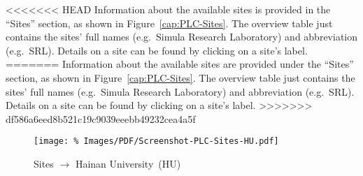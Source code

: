 <<<<<<< HEAD
Information about the available  sites is provided in the ``Sites'' section, as shown in Figure~\ref{cap:PLC-Sites}. The overview table just contains the sites' full names (e.g.\ Simula Research Laboratory) and abbreviation (e.g.\ SRL). Details on a site can be found by clicking on a site's label.
=======
Information about the available  sites are provided under the ``Sites'' section, as shown in Figure~\ref{cap:PLC-Sites}. The overview table just contains the sites' full names (e.g.\ Simula Research Laboratory) and abbreviation (e.g.\ SRL). Details on a site can be found by clicking on a site's label.
>>>>>>> df586a6eed8b521c19c9039eeebb49232cea4a5f

\begin{figure*}
\begin{center}
\texttt{[image: \%
   Images/PDF/Screenshot-PLC-Sites-HU.pdf]}
\end{center}
\caption{Sites $\rightarrow$ Hainan University~(HU)}
\label{cap:PLC-Sites-HU}
\end{figure*}

